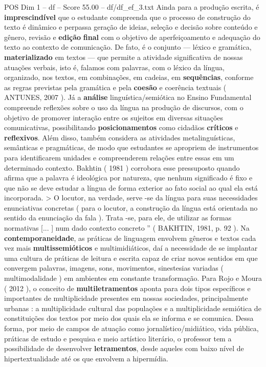 \begin{textsample}{POS Dim 1 – df – Score 55.00 – df/df\_ef\_3.txt}
Ainda para a produção escrita, é \textbf{imprescindível} que o estudante compreenda que o processo de construção do texto é dinâmico e perpassa geração de ideias, seleção e decisão sobre conteúdo e gênero, revisão e \textbf{edição} \textbf{final} com o objetivo de aperfeiçoamento e adequação do texto ao contexto de comunicação.
De fato, é o conjunto — léxico e gramática, \textbf{materializado} em textos — que permite a atividade significativa de nossas atuações verbais, isto é, falamos com palavras, com o léxico da língua, organizado, nos textos, em combinações, em cadeias, em \textbf{sequências}, conforme as regras previstas pela gramática e pela \textbf{coesão} e coerência textuais ( ANTUNES, 2007 ).
Já a \textbf{análise} linguística/semiótica no Ensino Fundamental compreende reflexões sobre o uso da língua na produção de discursos, com o objetivo de promover interação entre os sujeitos em diversas situações comunicativas, possibilitando \textbf{posicionamentos} como cidadãos \textbf{críticos} e \textbf{reflexivos}.
Além disso, também considera as atividades metalinguísticas, semânticas e pragmáticas, de modo que estudantes se apropriem de instrumentos para identificarem unidades e compreenderem relações entre essas em um determinado contexto.
Bakhtin ( 1981 ) corrobora esse pressuposto quando afirma que a palavra é ideológica por natureza, que nenhum significado é fixo e que não se deve estudar a língua de forma exterior ao fato social ao qual ela está incorporada. > O locutor, na verdade, serve -se da língua para suas necessidades enunciativas concretas ( para o locutor, a construção da língua está orientada no sentido da enunciação da fala ).
Trata -se, para ele, de utilizar as formas normativas [... ] num dado contexto concreto ” ( BAKHTIN, 1981, p. 92 ).
Na \textbf{contemporaneidade}, as práticas de linguagem envolvem gêneros e textos cada vez mais \textbf{multissemióticos} e multimidiáticos, daí a necessidade de se implantar uma cultura de práticas de leitura e escrita capaz de criar novos sentidos em que convergem palavras, imagens, sons, movimentos, sinestesias variadas ( multimodalidade ) em ambientes em constante transformação.
Para Rojo e Moura ( 2012 ), o conceito de \textbf{multiletramentos} aponta para dois tipos específicos e importantes de multiplicidade presentes em nossas sociedades, principalmente urbanas : a multiplicidade cultural das populações e a multiplicidade semiótica de constituições dos textos por meio dos quais ela se informa e se comunica.
Dessa forma, por meio de campos de atuação como jornalístico/midiático, vida pública, práticas de estudo e pesquisa e meio artístico literário, o professor tem a possibilidade de desenvolver \textbf{letramentos}, desde aqueles com baixo nível de hipertextualidade até os que envolvem a hipermídia.

\end{textsample}
